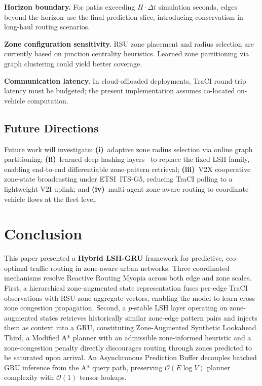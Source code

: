\documentclass[journal,letterpaper,10pt]{IEEEtran}
\theoremstyle{definition}
\theoremstyle{remark}
\newcommand{\bigO}[1]{\mathcal{O}\!\left(#1\right)}
\begin{document}
\noindent\textbf{Horizon boundary.}\enspace
For paths exceeding $H\!\cdot\!\Delta t$ simulation seconds, edges
beyond the horizon use the final prediction slice, introducing
conservatism in long-haul routing scenarios.

\noindent\textbf{Zone configuration sensitivity.}\enspace
RSU zone placement and radius selection are currently based on
junction centrality heuristics.  Learned zone partitioning via
graph clustering could yield better coverage.

\noindent\textbf{Communication latency.}\enspace
In cloud-offloaded deployments, TraCI round-trip latency must be
budgeted; the present implementation assumes co-located on-vehicle
computation.

\subsection{Future Directions}

Future work will investigate:
\textbf{(i)}~adaptive zone radius selection via online graph
partitioning;
\textbf{(ii)}~learned deep-hashing layers~\cite{wang2016deep}
to replace the fixed LSH family, enabling end-to-end differentiable
zone-pattern retrieval;
\textbf{(iii)}~V2X cooperative zone-state broadcasting under
ETSI~ITS-G5, reducing TraCI polling to a lightweight V2I uplink;
and \textbf{(iv)}~multi-agent zone-aware routing to coordinate
vehicle flows at the fleet level.

\section{Conclusion}
\label{sec:conc}

This paper presented a \textbf{Hybrid LSH-GRU} framework for
predictive, eco-optimal traffic routing in zone-aware urban networks.
Three coordinated mechanisms resolve Reactive Routing Myopia across
both edge and zone scales.  First, a hierarchical zone-augmented
state representation fuses per-edge TraCI observations with RSU
zone aggregate vectors, enabling the model to learn cross-zone
congestion propagation.  Second, a $p$-stable LSH layer operating
on zone-augmented states retrieves historically similar zone-edge
pattern pairs and injects them as context into a GRU, constituting
Zone-Augmented Synthetic Lookahead.  Third, a Modified A* planner
with an admissible zone-informed heuristic and a zone-congestion
penalty directly discourages routing through zones predicted to be
saturated upon arrival.  An Asynchronous Prediction Buffer decouples
batched GRU inference from the A* query path, preserving
$\bigO{E\log V}$ planner complexity with $\bigO{1}$ tensor lookups.
\end{document}
